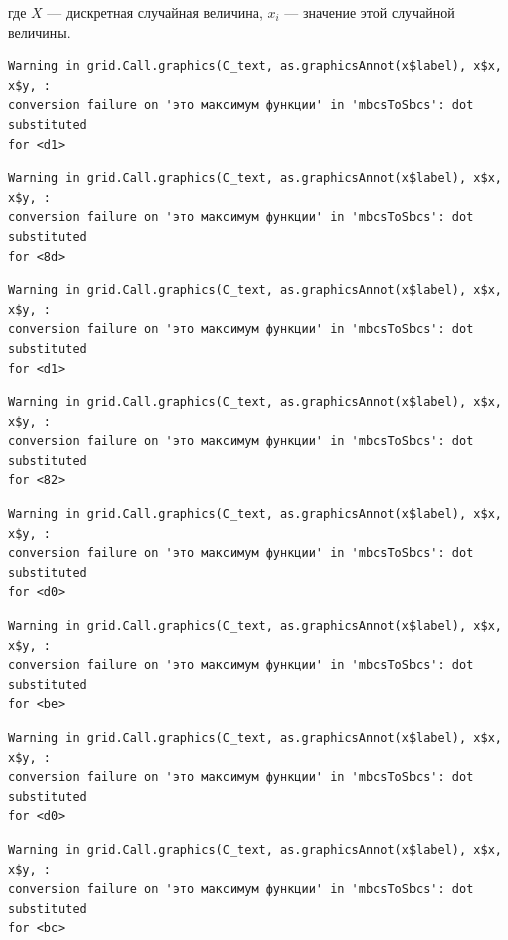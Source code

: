 \documentclass[
  letterpaper,
  DIV=11,
  numbers=noendperiod]{scrreprt}
\theoremstyle{definition}
\theoremstyle{remark}
\begin{document}
где \(X\) --- дискретная случайная величина, \(x_i\) --- значение этой
случайной величины.

\begin{verbatim}
Warning in grid.Call.graphics(C_text, as.graphicsAnnot(x$label), x$x, x$y, :
conversion failure on 'это максимум функции' in 'mbcsToSbcs': dot substituted
for <d1>
\end{verbatim}

\begin{verbatim}
Warning in grid.Call.graphics(C_text, as.graphicsAnnot(x$label), x$x, x$y, :
conversion failure on 'это максимум функции' in 'mbcsToSbcs': dot substituted
for <8d>
\end{verbatim}

\begin{verbatim}
Warning in grid.Call.graphics(C_text, as.graphicsAnnot(x$label), x$x, x$y, :
conversion failure on 'это максимум функции' in 'mbcsToSbcs': dot substituted
for <d1>
\end{verbatim}

\begin{verbatim}
Warning in grid.Call.graphics(C_text, as.graphicsAnnot(x$label), x$x, x$y, :
conversion failure on 'это максимум функции' in 'mbcsToSbcs': dot substituted
for <82>
\end{verbatim}

\begin{verbatim}
Warning in grid.Call.graphics(C_text, as.graphicsAnnot(x$label), x$x, x$y, :
conversion failure on 'это максимум функции' in 'mbcsToSbcs': dot substituted
for <d0>
\end{verbatim}

\begin{verbatim}
Warning in grid.Call.graphics(C_text, as.graphicsAnnot(x$label), x$x, x$y, :
conversion failure on 'это максимум функции' in 'mbcsToSbcs': dot substituted
for <be>
\end{verbatim}

\begin{verbatim}
Warning in grid.Call.graphics(C_text, as.graphicsAnnot(x$label), x$x, x$y, :
conversion failure on 'это максимум функции' in 'mbcsToSbcs': dot substituted
for <d0>
\end{verbatim}

\begin{verbatim}
Warning in grid.Call.graphics(C_text, as.graphicsAnnot(x$label), x$x, x$y, :
conversion failure on 'это максимум функции' in 'mbcsToSbcs': dot substituted
for <bc>
\end{verbatim}
\end{document}
